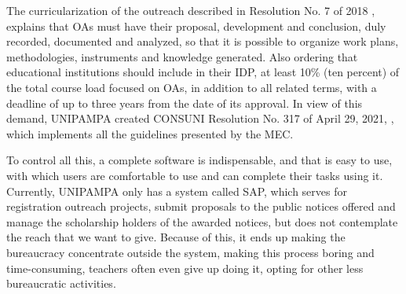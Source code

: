 The curricularization of the outreach described in Resolution No. 7 of 2018 \cite{Resolucao-MEC:2018}, explains that \acp{OA} must have their proposal, development and conclusion, duly recorded, documented and analyzed, so that it is possible to organize work plans, methodologies, instruments and knowledge generated. 
Also ordering that educational institutions should include in their \ac{IDP}, at least 10\% (ten percent) of the total course load focused on \acp{OA}, in addition to all related terms, with a deadline of up to three years from the date of its approval. 
In view of this demand, \acl{UNIPAMPA} created \ac{CONSUNI} Resolution No. 317 of April 29, 2021, \cite{res317}, which implements all the guidelines presented by the \ac{MEC}.



To control all this, a complete software is indispensable, and that is easy to use, with which users are comfortable to use and can complete their tasks using it. 
Currently, \acl{UNIPAMPA} only has a system called \ac{SAP}, which serves for registration outreach projects, submit proposals to the public notices offered and manage the scholarship holders of the awarded notices, but does not contemplate the reach that we want to give. 
Because of this, it ends up making the bureaucracy concentrate outside the system, making this process boring and time-consuming, teachers often even give up doing it, opting for other less bureaucratic activities.



